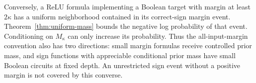 Conversely, a ReLU formula implementing a Boolean target with margin at least $2\kappa$ has a uniform neighborhood contained in its correct-sign margin event. Theorem~\ref{thm:uniform-mass} bounds the negative log probability of that event. Conditioning on $M_\kappa$ can only increase its probability. Thus the all-input-margin convention also has two directions: small margin formulas receive controlled prior mass, and sign functions with appreciable conditional prior mass have small Boolean circuits at fixed depth. An unrestricted sign event without a positive margin is not covered by this converse.
